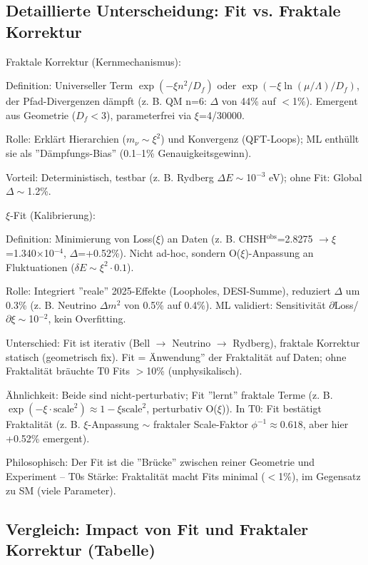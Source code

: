 	\subsection{Detaillierte Unterscheidung: Fit vs. Fraktale Korrektur}
	
	Fraktale Korrektur (Kernmechanismus):
	
	Definition: Universeller Term $\exp(-\xi n^2 / D_f)$ oder $\exp(-\xi \ln(\mu/\Lambda)/D_f)$, der Pfad-Divergenzen dämpft (z. B. QM n=6: $\Delta$ von 44\% auf $<$1\%). Emergent aus Geometrie ($D_f <$3), parameterfrei via $\xi$=4/30000.
	
	Rolle: Erklärt Hierarchien ($m_\nu \sim \xi^2$) und Konvergenz (QFT-Loops); ML enthüllt sie als ''Dämpfungs-Bias'' (0.1–1\% Genauigkeitsgewinn).
	
	Vorteil: Deterministisch, testbar (z. B. Rydberg $\Delta E \sim$10$^{-3}$ eV); ohne Fit: Global $\Delta\sim$1.2\%.
	
	$\xi$-Fit (Kalibrierung):
	
	Definition: Minimierung von Loss($\xi$) an Daten (z. B. CHSH$^\text{obs}$=2.8275 $\to \xi$=1.340$\times$10$^{-4}$, $\Delta$=+0.52\%). Nicht ad-hoc, sondern O($\xi$)-Anpassung an Fluktuationen ($\delta E \sim \xi^2 \cdot 0.1$).
	
	Rolle: Integriert ''reale'' 2025-Effekte (Loopholes, DESI-Summe), reduziert $\Delta$ um 0.3\% (z. B. Neutrino $\Delta m^2$ von 0.5\% auf 0.4\%). ML validiert: Sensitivität $\partial$Loss/$\partial\xi \sim$10$^{-2}$, kein Overfitting.
	
	Unterschied: Fit ist iterativ (Bell $\to$ Neutrino $\to$ Rydberg), fraktale Korrektur statisch (geometrisch fix). Fit = Änwendung'' der Fraktalität auf Daten; ohne Fraktalität bräuchte T0 Fits $>$10\% (unphysikalisch).
	
	Ähnlichkeit: Beide sind nicht-perturbativ; Fit ''lernt'' fraktale Terme (z. B. $\exp(-\xi \cdot \text{scale}^2) \approx 1 - \xi \text{scale}^2$, perturbativ O($\xi$)). In T0: Fit bestätigt Fraktalität (z. B. $\xi$-Anpassung $\sim$ fraktaler Scale-Faktor $\phi^{-1} \approx0.618$, aber hier +0.52\% emergent).
	
	Philosophisch: Der Fit ist die ''Brücke'' zwischen reiner Geometrie und Experiment – T0s Stärke: Fraktalität macht Fits minimal ($<$1\%), im Gegensatz zu SM (viele Parameter).
	
	\subsection{Vergleich: Impact von Fit und Fraktaler Korrektur (Tabelle)}
	
